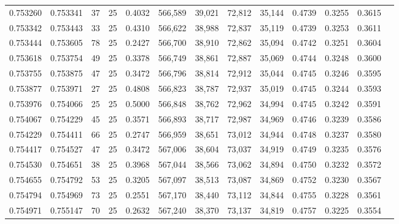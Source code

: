 \begin{tabular}{rrrrrrrrrrrrr}
0.753260 & 0.753341 &    37 &  25 &                                     0.4032 & 566,589 &  39,021 &  72,812 &  35,144 & 0.4739 & 0.3255 & 0.3615 \\
0.753342 & 0.753443 &    33 &  25 &                                     0.4310 & 566,622 &  38,988 &  72,837 &  35,119 & 0.4739 & 0.3253 & 0.3611 \\
0.753444 & 0.753605 &    78 &  25 &                                     0.2427 & 566,700 &  38,910 &  72,862 &  35,094 & 0.4742 & 0.3251 & 0.3604 \\
0.753618 & 0.753754 &    49 &  25 &                                     0.3378 & 566,749 &  38,861 &  72,887 &  35,069 & 0.4744 & 0.3248 & 0.3600 \\
0.753755 & 0.753875 &    47 &  25 &                                     0.3472 & 566,796 &  38,814 &  72,912 &  35,044 & 0.4745 & 0.3246 & 0.3595 \\
0.753877 & 0.753971 &    27 &  25 &                                     0.4808 & 566,823 &  38,787 &  72,937 &  35,019 & 0.4745 & 0.3244 & 0.3593 \\
0.753976 & 0.754066 &    25 &  25 &                                     0.5000 & 566,848 &  38,762 &  72,962 &  34,994 & 0.4745 & 0.3242 & 0.3591 \\
0.754067 & 0.754229 &    45 &  25 &                                     0.3571 & 566,893 &  38,717 &  72,987 &  34,969 & 0.4746 & 0.3239 & 0.3586 \\
0.754229 & 0.754411 &    66 &  25 &                                     0.2747 & 566,959 &  38,651 &  73,012 &  34,944 & 0.4748 & 0.3237 & 0.3580 \\
0.754417 & 0.754527 &    47 &  25 &                                     0.3472 & 567,006 &  38,604 &  73,037 &  34,919 & 0.4749 & 0.3235 & 0.3576 \\
0.754530 & 0.754651 &    38 &  25 &                                     0.3968 & 567,044 &  38,566 &  73,062 &  34,894 & 0.4750 & 0.3232 & 0.3572 \\
0.754655 & 0.754792 &    53 &  25 &                                     0.3205 & 567,097 &  38,513 &  73,087 &  34,869 & 0.4752 & 0.3230 & 0.3567 \\
0.754794 & 0.754969 &    73 &  25 &                                     0.2551 & 567,170 &  38,440 &  73,112 &  34,844 & 0.4755 & 0.3228 & 0.3561 \\
0.754971 & 0.755147 &    70 &  25 &                                     0.2632 & 567,240 &  38,370 &  73,137 &  34,819 & 0.4757 & 0.3225 & 0.3554 \\

\end{tabular}
